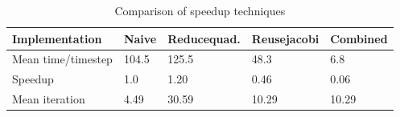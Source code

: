 \begin{table}[h]
\centering
\caption{Comparison of speedup techniques }
\label{my-label}
\begin{tabular}{ |p{2.8cm}|p{2.4cm}||p{2.4cm}|p{2.4cm}|p{2.4cm}|  }
 \hline
Implementation &Naive  & Reducequad. & Reusejacobi & Combined \\
 \hline
 Mean time/timestep &   104.5 &  125.5 & 48.3  & 6.8   \\
 \hline
 Speedup & 1.0 &  1.20  & 0.46  & 0.06   \\
 \hline
 Mean iteration &  4.49 &  30.59 & 10.29  & 10.29   \\
 \hline
\end{tabular}
\end{table}
